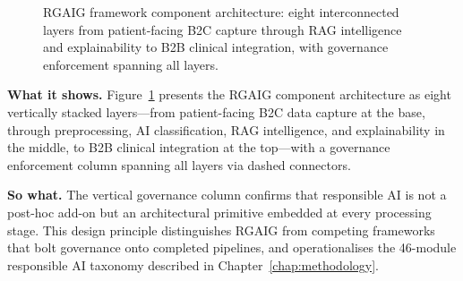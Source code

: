 \begin{figure}[!htbp]
\caption[RGAIG framework component architecture]{RGAIG framework component architecture: eight interconnected layers from patient-facing B2C capture through RAG intelligence and explainability to B2B clinical integration, with governance enforcement spanning all layers.}
\label{fig:framework_components}
\end{figure}


\noindent\textbf{What it shows.} Figure~\ref{fig:framework_components} presents the RGAIG component architecture as eight vertically stacked layers---from patient-facing B2C data capture at the base, through preprocessing, AI classification, RAG intelligence, and explainability in the middle, to B2B clinical integration at the top---with a governance enforcement column spanning all layers via dashed connectors.


\noindent\textbf{So what.} The vertical governance column confirms that responsible AI is not a post-hoc add-on but an architectural primitive embedded at every processing stage. This design principle distinguishes RGAIG from competing frameworks that bolt governance onto completed pipelines, and operationalises the 46-module responsible AI taxonomy described in Chapter~\ref{chap:methodology}.


